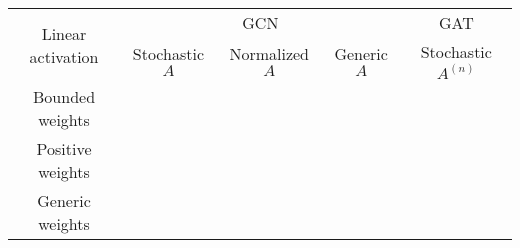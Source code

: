 \begin{tabular}{c|c c c|c}
        \toprule
        \multirow{2}{*}{Linear activation} & \multicolumn{3}{c|}{GCN} & \multicolumn{1}{c}{GAT} \\
        \cmidrule(lr){2-4} \cmidrule(lr){5-5}
        & Stochastic $A$ & Normalized $A$ & Generic $A$ & Stochastic $A^{(n)}$ \\ 
        \midrule
        Bounded weights & & & & \\
        Positive weights & & & & \\
        Generic weights & & \makecell{\cite{rothRankCollapseCauses2024} \\ \cite{yanTwoSidesSame2021}} & \cite{kerivenNotTooLittle2022} & \cite{rothRankCollapseCauses2024} \\
        \bottomrule
    \end{tabular}